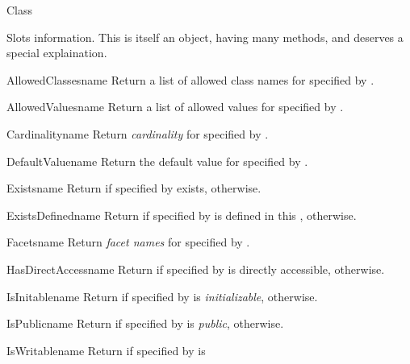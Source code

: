 \begin{classdesc*}{Class}
\begin{memberdesc}[property]{Slots}
  information. This is itself an object, having
many methods, and deserves a special explaination.
\begin{methoddesc}{AllowedClasses}{name}
Return a list of allowed class names for  specified by
.
\end{methoddesc}
\begin{methoddesc}{AllowedValues}{name}
Return a list of allowed values for  specified by .
\end{methoddesc}
\begin{methoddesc}{Cardinality}{name}
Return \emph{cardinality} for  specified by .
\end{methoddesc}
\begin{methoddesc}{DefaultValue}{name}
Return the default value for  specified by .
\end{methoddesc}
\begin{methoddesc}{Exists}{name}
Return  if  specified by  exists,
 otherwise.
\end{methoddesc}
\begin{methoddesc}{ExistsDefined}{name}
Return  if  specified by  is defined
in this ,  otherwise.
\end{methoddesc}
\begin{methoddesc}{Facets}{name}
Return \emph{facet names} for  specified by .
\end{methoddesc}
\begin{methoddesc}{HasDirectAccess}{name}
Return  if  specified by  is directly
accessible,  otherwise.
\end{methoddesc}
\begin{methoddesc}{IsInitable}{name}
Return  if  specified by  is
\emph{initializable},  otherwise.
\end{methoddesc}
\begin{methoddesc}{IsPublic}{name}
Return  if  specified by  is
\emph{public},  otherwise.
\end{methoddesc}
\begin{methoddesc}{IsWritable}{name}
Return  if  specified by  is

\end{methoddesc}
\end{memberdesc}
\end{classdesc*}
